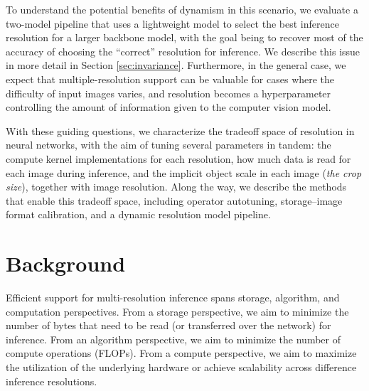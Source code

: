 To understand the potential benefits of dynamism in this scenario, we evaluate a two-model pipeline that uses a lightweight model to select the best inference resolution for a larger backbone model, with the goal being to recover most of the accuracy of choosing the ``correct'' resolution for inference.
We describe this issue in more detail in Section \ref{sec:invariance}.
Furthermore, in the general case, we expect that multiple-resolution support can be valuable for cases where the difficulty of input images varies, and resolution becomes a hyperparameter controlling the amount of information given to the computer vision model.

With these guiding questions, we characterize the tradeoff space of resolution in neural networks, with the aim of tuning several parameters in tandem: the compute kernel implementations for each resolution, how much data is read for each image during inference, and the implicit object scale in each image (\emph{the crop size}), together with image resolution.
Along the way, we describe the methods that enable this tradeoff space, including operator autotuning, storage--image format calibration, and a dynamic resolution model pipeline.


\section{Background}
Efficient support for multi-resolution inference spans storage, algorithm, and computation perspectives.
From a storage perspective, we aim to minimize the number of bytes that need to be read (or transferred over the network) for inference.
From an algorithm perspective, we aim to minimize the number of compute operations (FLOPs).
From a compute perspective, we aim to maximize the utilization of the underlying hardware or achieve scalability across difference inference resolutions.

